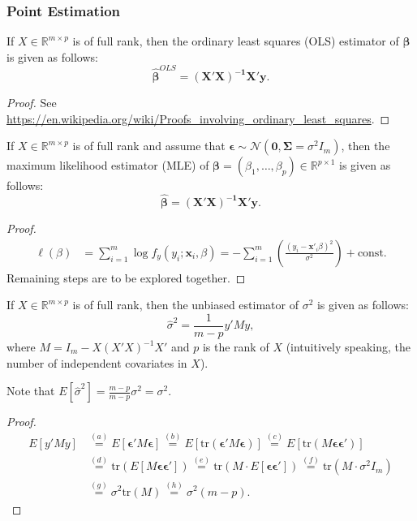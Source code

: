 \documentclass[ignorenonframetext,]{beamer}
\begin{document}
\begin{frame}[allowframebreaks]
\frametitle{Point Estimation}
\begin{theorem}
If $X  \in \mathbb{R}^{m \times p}$ is of full rank, then the ordinary least squares (OLS) estimator of $\bm{\beta}$ is given as follows:
$$
\hat{\bm{\beta}}^{OLS}=\bm{(X'X)^{-1} X'y}.
$$
\end{theorem}

\begin{proof}
See \url{https://en.wikipedia.org/wiki/Proofs_involving_ordinary_least_squares}.
\end{proof}

\framebreak
\begin{theorem}
If $X \in \mathbb{R}^{m \times p}$ is of full rank and assume that $\bm{\epsilon} \sim \mathcal{N}(\bm{0, \Sigma}=\sigma^2 I_m)$, then the maximum likelihood estimator (MLE) of $\bm{\beta}=(\beta_1, \ldots, \beta_p) \in \mathbb{R}^{p \times 1}$ is given as follows:
$$
\hat{\bm{\beta}}=\bm{(X'X)^{-1} X'y}.
$$
\end{theorem}

\begin{proof}
$$
\begin{aligned}
\ell(\beta) &= \sum_{i=1}^m \log f_{y}(y_i;\mathbf{x}_i, \beta) =   -\sum_{i=1}^m  \left( \frac{(y_{i}-  \mathbf{x}'_i\beta)^2}{\sigma^2} \right)  + \text{const}.
\end{aligned}
$$
Remaining steps are to be explored together.
\end{proof}

\framebreak

\begin{theorem}
If $X \in \mathbb{R}^{m \times p}$ is of full rank, then the unbiased estimator of $\sigma^2$ is given as follows:
$$
\hat{\sigma}^2= \frac{1}{m-p} y' M y,
$$
where $M = I_m - X(X'X)^{-1}X'$ and  $p$ is the rank of $X$ (intuitively speaking, the number of independent covariates in $X$).
\end{theorem}
Note that $E[\hat{\sigma}^2] = \frac{m-p}{m-p} \sigma^2=  \sigma^2$.

\begin{proof}
$$
\begin{aligned}
E[y' M y] &\overset{(a)}{=} E[\bm{\epsilon}' M \bm{\epsilon}] \overset{(b)}{=}  E[\text{tr}(\bm{\epsilon}' M \bm{\epsilon})]\overset{(c)}{=}  E[\text{tr}(M\bm{\epsilon}  \bm{\epsilon}')]\\ 
&\overset{(d)}{=}  \text{tr}(E[M\bm{\epsilon}  \bm{\epsilon}']) 
\overset{(e)}{=} \text{tr}(M \cdot E[\bm{\epsilon}  \bm{\epsilon}'])\overset{(f)}{=} \text{tr}(M \cdot \sigma^2 I_m) \\
&\overset{(g)}{=} \sigma^2 \text{tr}(M) \overset{(h)}{=} \sigma^2 (m-p).
\end{aligned}
$$
\end{proof}


\end{frame}
\end{document}
